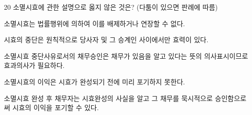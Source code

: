 \begin{question}{20}
소멸시효에 관한 설명으로 옳지 않은 것은? (다툼이 있으면 판례에 따름)
\begin{choices}
  \item 소멸시효는 법률행위에 의하여 이를 배제하거나 연장할 수 없다.
  \item 시효의 중단은 원칙적으로 당사자 및 그 승계인 사이에서만 효력이 있다.
  \item 소멸시효 중단사유로서의 채무승인은 채무가 있음을 알고 있다는 뜻의 의사표시이므로 효과의사가 필요하다.
  \item 소멸시효의 이익은 시효가 완성되기 전에 미리 포기하지 못한다.
  \item 소멸시효 완성 후 채무자는 시효완성의 사실을 알고 그 채무를 묵시적으로 승인함으로써 시효의 이익을 포기할 수 있다.
\end{choices}
\end{question}

